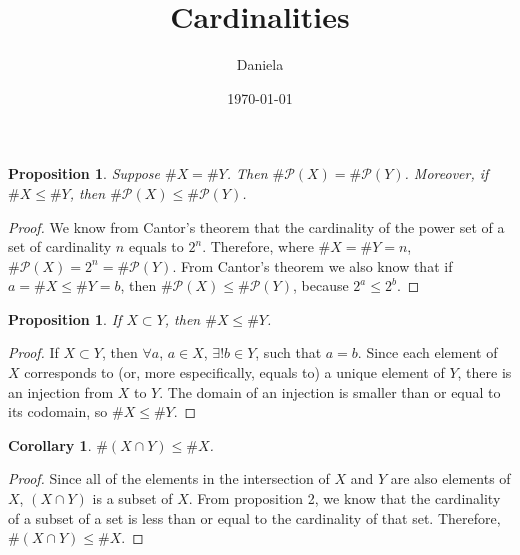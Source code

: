 \documentclass[11pt,reqno,oneside,a4paper]{article}
\title{Cardinalities}
\author{Daniela}
\date{\today}
\newtheorem{proposition}[theorem]{Proposition}
\newtheorem{corollary}[theorem]{Corollary}
\begin{document}
\maketitle

\begin{proposition} \label{proposition:PowerSetsPreserveEquinumerosity}
	Suppose $\# X=\# Y$.
	Then $\# \mathcal{P}(X)=\# \mathcal{P}(Y)$.
	Moreover, if $\# X\leq\# Y$, then $\# \mathcal{P}(X)\leq\# \mathcal{P}(Y)$.
\end{proposition}

\begin{proof}
We know from Cantor's theorem that the cardinality of the power set of a set of cardinality $n$ equals to $2^n$. Therefore, where $\# X=\# Y = n $, $\# \mathcal{P}(X)= 2^n = \# \mathcal{P}(Y)$. From Cantor's theorem we also know that  if $a = \# X\leq\# Y = b$, then $\#\mathcal{P}(X)\leq\# \mathcal{P}(Y)$, because $2^a \leq 2^b$.
\end{proof}

\begin{proposition} \label{prop:SubsetCardinality}
	If $X\subset Y$, then $\# X\leq \# Y$.
\end{proposition}

\begin{proof}
If $X\subset Y$, then $\forall a$, $a \in X$, $	\exists! b \in Y$, such that $a=b$. Since each element of $X$ corresponds to (or, more especifically, equals to) a unique element of $Y$, there is an injection from $X$ to $Y$. The domain of an injection is smaller than or equal to its codomain, so  $\# X\leq \# Y$.
\end{proof}

\begin{corollary} \label{cor:IntersectionCardinality}
	$\# (X\cap Y) \leq \# X$.
\end{corollary}

\begin{proof}
Since all of the elements in the intersection of $X$ and $Y$ are also elements of $X$, $(X \cap Y)$ is a subset of $X$. From proposition 2, we know that the cardinality of a subset of a set is less than or equal to the cardinality of that set. Therefore, $\#(X\cap Y) \leq \#X$.
\end{proof}
\end{document}
